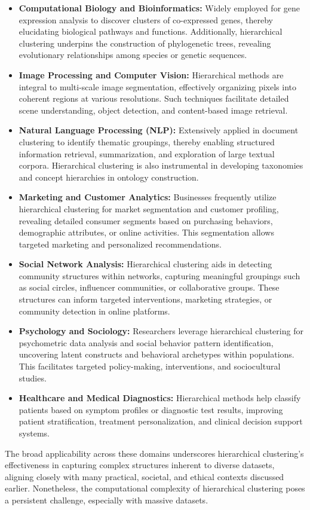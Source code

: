 \begin{itemize}
    \item \textbf{Computational Biology and Bioinformatics:} Widely employed for gene expression analysis to discover clusters of co-expressed genes, thereby elucidating biological pathways and functions. Additionally, hierarchical clustering underpins the construction of phylogenetic trees, revealing evolutionary relationships among species or genetic sequences.
    
    \item \textbf{Image Processing and Computer Vision:} Hierarchical methods are integral to multi-scale image segmentation, effectively organizing pixels into coherent regions at various resolutions. Such techniques facilitate detailed scene understanding, object detection, and content-based image retrieval.
    
    \item \textbf{Natural Language Processing (NLP):} Extensively applied in document clustering to identify thematic groupings, thereby enabling structured information retrieval, summarization, and exploration of large textual corpora. Hierarchical clustering is also instrumental in developing taxonomies and concept hierarchies in ontology construction.
    
    \item \textbf{Marketing and Customer Analytics:} Businesses frequently utilize hierarchical clustering for market segmentation and customer profiling, revealing detailed consumer segments based on purchasing behaviors, demographic attributes, or online activities. This segmentation allows targeted marketing and personalized recommendations.
    
    \item \textbf{Social Network Analysis:} Hierarchical clustering aids in detecting community structures within networks, capturing meaningful groupings such as social circles, influencer communities, or collaborative groups. These structures can inform targeted interventions, marketing strategies, or community detection in online platforms.
    
    \item \textbf{Psychology and Sociology:} Researchers leverage hierarchical clustering for psychometric data analysis and social behavior pattern identification, uncovering latent constructs and behavioral archetypes within populations. This facilitates targeted policy-making, interventions, and sociocultural studies.
    
    \item \textbf{Healthcare and Medical Diagnostics:} Hierarchical methods help classify patients based on symptom profiles or diagnostic test results, improving patient stratification, treatment personalization, and clinical decision support systems.
\end{itemize}

The broad applicability across these domains underscores hierarchical clustering’s effectiveness in capturing complex structures inherent to diverse datasets, aligning closely with many practical, societal, and ethical contexts discussed earlier. Nonetheless, the computational complexity of hierarchical clustering poses a persistent challenge, especially with massive datasets.
